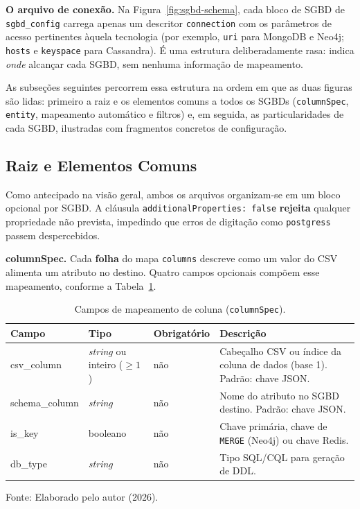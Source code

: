 \textbf{O arquivo de conexão.} Na Figura~\ref{fig:sgbd-schema}, cada bloco de
SGBD de \texttt{sgbd\_config} carrega apenas um descritor
\texttt{connection} com os parâmetros de acesso pertinentes àquela tecnologia (por
exemplo, \texttt{uri} para MongoDB e Neo4j; \texttt{hosts} e \texttt{keyspace} para
Cassandra). É uma estrutura deliberadamente rasa: indica \textit{onde} alcançar cada
SGBD, sem nenhuma informação de mapeamento.

As subseções seguintes percorrem essa estrutura na ordem em que as duas figuras são
lidas: primeiro a raiz e os elementos comuns a todos os SGBDs
(\texttt{columnSpec}, \texttt{entity}, mapeamento automático e filtros) e, em seguida, as
particularidades de cada SGBD, ilustradas com fragmentos concretos de configuração.

\subsection{Raiz e Elementos Comuns}
\label{sec:raiz}

Como antecipado na visão geral, ambos os arquivos organizam-se em um bloco opcional por
SGBD. A cláusula \texttt{additionalProperties: false} \textbf{rejeita} qualquer
propriedade não prevista, impedindo que erros de digitação como \texttt{postgress}
passem despercebidos.

\textbf{columnSpec.} Cada \textbf{folha} do mapa \texttt{columns} descreve como um valor
do CSV alimenta um atributo no destino. Quatro campos opcionais compõem esse mapeamento,
conforme a Tabela~\ref{tab:columnspec}.

\begin{table}[H]
  \caption{Campos de mapeamento de coluna (\texttt{columnSpec}).}
  \label{tab:columnspec}
  \centering
  \begin{tabular}{>{\ttfamily}l l l >{\raggedright\arraybackslash}p{5cm}}
    \toprule
    \normalfont\textbf{Campo} & \textbf{Tipo} & \textbf{Obrigatório} & \textbf{Descrição} \\
    \midrule
    csv\_column    & \textit{string} ou inteiro ($\geq 1$) & não & Cabeçalho CSV ou índice da coluna de dados (base 1). Padrão: chave JSON. \\
    schema\_column & \textit{string} & não & Nome do atributo no SGBD destino. Padrão: chave JSON. \\
    is\_key        & booleano & não & Chave primária, chave de \texttt{MERGE} (Neo4j) ou chave Redis. \\
    db\_type       & \textit{string} & não & Tipo SQL/CQL para geração de DDL. \\
    \bottomrule
  \end{tabular}
  \par\vspace{4pt}
  {\footnotesize Fonte: Elaborado pelo autor (2026).}
\end{table}

